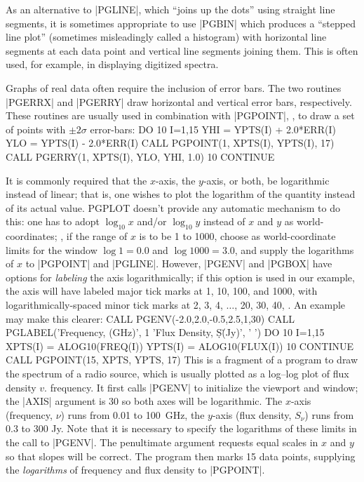 As an alternative to |PGLINE|, which ``joins up the dots'' using
straight line segments, it is sometimes appropriate to use |PGBIN|
which produces a ``stepped line plot'' (sometimes misleadingly called
a histogram) with horizontal line segments at each data point and 
vertical line segments joining them.  This is often used, for example,
in displaying digitized spectra.

Graphs of real data often require the inclusion of error bars.  The two
routines |PGERRX| and |PGERRY| draw horizontal and vertical error bars,
respectively.  These routines are usually used in combination with 
|PGPOINT|, \eg, to draw a set of points with $\pm2\sigma$ error-bars:
\begintt
      DO 10 I=1,15
          YHI = YPTS(I) + 2.0*ERR(I)
          YLO = YPTS(I) - 2.0*ERR(I)
          CALL PGPOINT(1, XPTS(I), YPTS(I), 17)
          CALL PGERRY(1, XPTS(I), YLO, YHI, 1.0)
   10 CONTINUE
\endtt

It is commonly required that the $x$-axis, the $y$-axis, or both, be
logarithmic instead of linear; that is, one wishes to plot the
logarithm of the quantity instead of its actual value.  PGPLOT doesn't
provide any automatic mechanism to do this: one has to adopt $\log_{10} x$
and/or $\log_{10} y$ instead of $x$ and $y$ as world-coordinates; \ie,
if the range of $x$ is to be 1 to 1000, choose as world-coordinate 
limits for the window $\log 1 = 0.0$ and $\log 1000 = 3.0$, and supply
the logarithms of $x$ to |PGPOINT| and |PGLINE|.  However, |PGENV| and
|PGBOX| have options for {\it labeling\/} the axis logarithmically;
if this option is used in our example, the axis will have labeled
major tick marks at 1, 10, 100, and 1000, with logarithmically-spaced
minor tick marks at 2, 3, 4, $\ldots$, 20, 30, 40, \etc.  An example may 
make this clearer:
\begintt
      CALL PGENV(-2.0,2.0,-0.5,2.5,1,30)
      CALL PGLABEL('Frequency, \gn (GHz)',
     1             'Flux Density, S\d\gn\u (Jy)', ' ')
      DO 10 I=1,15
          XPTS(I) = ALOG10(FREQ(I))
          YPTS(I) = ALOG10(FLUX(I))
   10 CONTINUE
      CALL PGPOINT(15, XPTS, YPTS, 17)
\endtt
This is a fragment of a program to draw the spectrum of a radio source,
which is usually plotted as a log--log plot of flux density $v$.
frequency. It first calls |PGENV| to initialize the viewport and window;
the |AXIS| argument is 30 so both axes will be logarithmic. The $x$-axis
(frequency, $\nu$) runs from 0.01 to 100~GHz, the $y$-axis (flux 
density, $S_\nu$) runs from 0.3 to 300 Jy. Note that it is necessary to
specify the logarithms of these limits in the call to |PGENV|. The
penultimate argument requests equal scales in $x$ and $y$ so that slopes
will be correct. The program then marks 15 data points, supplying the 
{\it logarithms} of frequency and flux density to |PGPOINT|.

